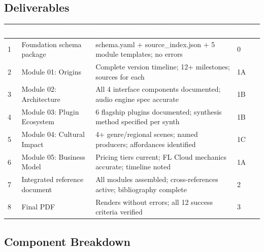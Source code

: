 \documentclass[11pt,letterpaper]{article}
\newcommand{\tableheader}[1]{\textbf{\sffamily\textcolor{white}{#1}}}
\begin{document}
\subsection{Deliverables}

\begin{center}
\begin{tabularx}{\textwidth}{C{0.8cm}L{3.5cm}XC{2cm}}
\toprule
{}
\tableheader{\#} & \tableheader{Deliverable} & \tableheader{Acceptance Criteria} & \tableheader{Wave} \\
 & Foundation schema package & schema.yaml + source\_index.json + 5 module templates; no errors & 0 \\
2 & Module 01: Origins & Complete version timeline; 12+ milestones; sources for each & 1A \\
3 & Module 02: Architecture & All 4 interface components documented; audio engine spec accurate & 1B \\
4 & Module 03: Plugin Ecosystem & 6 flagship plugins documented; synthesis method specified per synth & 1B \\
5 & Module 04: Cultural Impact & 4+ genre/regional scenes; named producers; affordances identified & 1C \\
6 & Module 05: Business Model & Pricing tiers current; FL Cloud mechanics accurate; timeline noted & 1A \\
7 & Integrated reference document & All modules assembled; cross-references active; bibliography complete & 2 \\
8 & Final PDF & Renders without errors; all 12 success criteria verified & 3 \\
\bottomrule
\end{tabularx}
\end{center}

\subsection{Component Breakdown}
\end{document}
